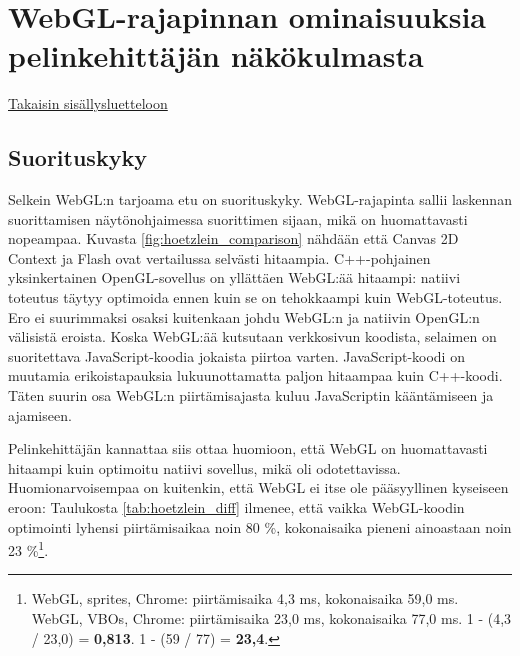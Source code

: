 \section{WebGL-rajapinnan ominaisuuksia pelinkehittäjän näkökulmasta}
\label{sec:materiaali}
\hyperlink{index}{Takaisin sisällysluetteloon}
\subsection{Suorituskyky}
Selkein WebGL:n tarjoama etu on suorituskyky. WebGL-rajapinta sallii laskennan suorittamisen näytönohjaimessa suorittimen sijaan, mikä on huomattavasti nopeampaa. Kuvasta \ref{fig:hoetzlein_comparison} nähdään että Canvas 2D Context ja Flash ovat vertailussa selvästi hitaampia. C++-pohjainen yksinkertainen OpenGL-sovellus on yllättäen WebGL:ää hitaampi: natiivi toteutus täytyy optimoida ennen kuin se on tehokkaampi kuin WebGL-toteutus.\cite{hoetzlein} Ero ei suurimmaksi osaksi kuitenkaan johdu WebGL:n ja natiivin OpenGL:n välisistä eroista. Koska WebGL:ää kutsutaan verkkosivun koodista, selaimen on suoritettava JavaScript-koodia jokaista piirtoa varten. JavaScript-koodi on muutamia erikoistapauksia lukuunottamatta paljon hitaampaa kuin C++-koodi\cite{smedberg}. Täten suurin osa WebGL:n piirtämisajasta kuluu JavaScriptin kääntämiseen ja ajamiseen\cite{hoetzlein}.

Pelinkehittäjän kannattaa siis ottaa huomioon, että WebGL on huomattavasti hitaampi kuin optimoitu natiivi sovellus, mikä oli odotettavissa. Huomionarvoisempaa on kuitenkin, että WebGL ei itse ole pääsyyllinen kyseiseen eroon: Taulukosta \ref{tab:hoetzlein_diff} ilmenee, että vaikka WebGL-koodin optimointi lyhensi piirtämisaikaa noin 80 \%, kokonaisaika pieneni ainoastaan noin 23 \%\footnote{WebGL, sprites, Chrome: piirtämisaika 4,3 ms, kokonaisaika 59,0 ms. WebGL, VBOs, Chrome: piirtämisaika 23,0 ms, kokonaisaika 77,0 ms. 1 - (4,3 / 23,0) = \textbf{0,813}. 1 - (59 / 77) = \textbf{23,4}.}.


